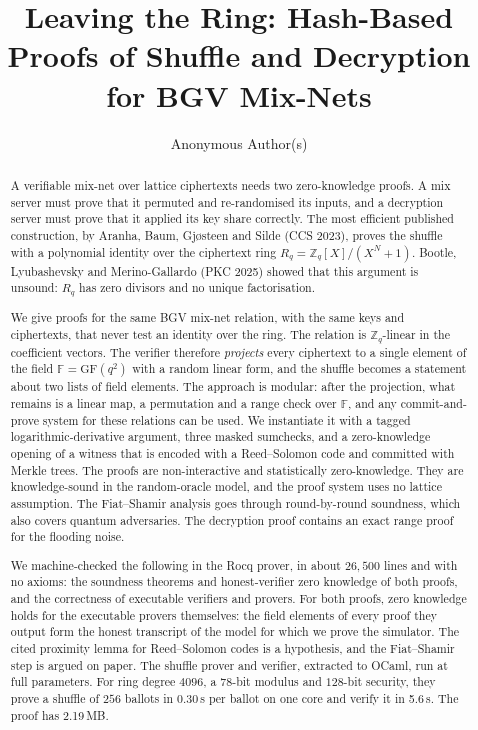 \documentclass[sigconf,anonymous]{acmart}
\newcommand{\Zq}{\mathbb{Z}_q}
\newcommand{\Rq}{R_q}
\newcommand{\F}{\mathbb{F}}
\newcommand{\xbProveA}{0.30}  %
\newcommand{\xbVerA}{5.6}    %
\newcommand{\xbSizeA}{2.19}  %
\begin{document}
\title{Leaving the Ring: Hash-Based Proofs of Shuffle and Decryption for BGV Mix-Nets}

\author{Anonymous Author(s)}

\begin{abstract}
A verifiable mix-net over lattice ciphertexts needs two zero-knowledge proofs. A mix server must
prove that it permuted and re-randomised its inputs, and a decryption server must prove that it
applied its key share correctly. The most efficient published construction, by Aranha, Baum,
Gj{\o}steen and Silde (CCS 2023), proves the shuffle with a polynomial identity over the ciphertext
ring $\Rq=\Zq[X]/(X^N+1)$. Bootle, Lyubashevsky and Merino-Gallardo (PKC 2025) showed that this
argument is unsound: $\Rq$ has zero divisors and no unique factorisation.

We give proofs for the same BGV mix-net relation, with the same keys and ciphertexts, that never
test an identity over the ring. The relation is $\Zq$-linear in the coefficient vectors. The
verifier therefore \emph{projects} every ciphertext to a single element of the field
$\F=\mathrm{GF}(q^2)$ with a random linear form, and the shuffle becomes a statement about two
lists of field elements. The approach is modular: after the projection, what remains is a linear
map, a permutation and a range check over $\F$, and any commit-and-prove system for these
relations can be used. We instantiate it with a tagged logarithmic-derivative argument, three
masked sumchecks, and a zero-knowledge opening of a witness that is encoded with a Reed--Solomon
code and committed with Merkle trees. The proofs are non-interactive and statistically
zero-knowledge. They are knowledge-sound in the random-oracle model, and the proof system uses no
lattice assumption. The Fiat--Shamir analysis goes through round-by-round soundness, which also
covers quantum adversaries. The decryption proof contains an exact range proof for the flooding
noise.

We machine-checked the following in the Rocq prover, in about $26{,}500$ lines and with no axioms:
the soundness theorems and honest-verifier zero knowledge of both proofs, and the correctness of
executable verifiers and provers. For both proofs, zero knowledge holds for the executable provers
themselves: the field elements of every proof they output form the honest transcript of the model
for which we prove the simulator. The cited proximity lemma for Reed--Solomon codes is a
hypothesis, and the Fiat--Shamir step is argued on paper. The shuffle prover and verifier,
extracted to OCaml, run at full parameters. For ring degree $4096$, a $78$-bit modulus and
$128$-bit security, they prove a shuffle of $256$ ballots in \xbProveA\,s per ballot on one core
and verify it in \xbVerA\,s. The proof has \xbSizeA\,MB.
\end{abstract}
\end{document}
